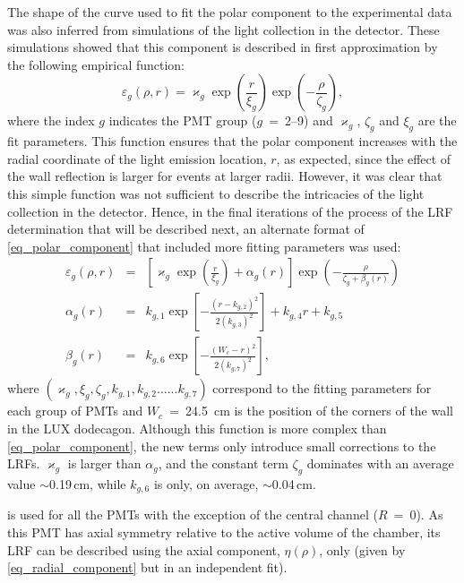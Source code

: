 \documentclass[a4paper,11pt]{article}
\begin{document}
The shape of the curve used to fit the polar component to the experimental data was also inferred from simulations of the light collection in the detector. These simulations showed that this component is described in first approximation by the following empirical function:
\begin{equation}
\varepsilon_g \left(\rho, r\right) = \varkappa_g \exp{\left(\frac{r}{\xi_g}\right)}\exp{\left(-\frac{\rho}{\zeta_g}\right)},
\label{eq_polar_component}
\end{equation}
where the index $g$ indicates the PMT group ($g$~=~2--9) and $\varkappa_g$, $\zeta_g$ and $\xi_g$ are the fit parameters. This function ensures that the polar component increases with the radial coordinate of the light emission location, $r$, as expected, since the effect of the wall reflection is larger for  events at larger radii. However, it was clear that this simple function was not sufficient to describe the intricacies of the light collection in the detector. Hence, in the final iterations of the process of the LRF determination that will be described next, an alternate format of \cref{eq_polar_component} that included more fitting parameters was used:
\begin{eqnarray}
\varepsilon_g \left(\rho, r\right)  & = & \left[\varkappa_g \exp{\left(\frac{r}{\xi_g}\right)} + \alpha_g(r) \right]\exp{\left(-\frac{\rho}{\zeta_g + \beta_g(r)}\right)}\nonumber\\
\alpha_g\left(r\right)  & = & k_{g,1} \exp{\left[-\frac{\left(r-k_{g,2}\right)^2}{2\left(k_{g,3}\right)^2}\right]} + k_{g,4} r + k_{g,5} \nonumber \\
\beta_g\left(r\right)  & = & k_{g,6}\exp{\left[ -\frac{\left(W_c-r\right)^2}{2\left(k_{g,7}\right)^2}\right]},
\label{eq_polst}
\end{eqnarray}
where $\left(\varkappa_g, \xi_g, \zeta_g, k_{g,1}, k_{g,2} ...... k_{g, 7}\right)$ correspond to the fitting parameters for each group of PMTs and $W_c$~=~24.5~cm is the position of the corners of the wall in the LUX dodecagon. Although this function is more complex than \cref{eq_polar_component}, the new terms only introduce small corrections to the LRFs. $\varkappa_g$ is larger than $\alpha_g$, and the constant term $\zeta_g$ dominates with an average value  $\sim$0.19\,cm, while $k_{g,6}$ is only, on average, $\sim$0.04\,cm.

 is used for all the PMTs with the exception of the central channel ($R$~=~0). As this PMT has axial symmetry relative to the active volume of the chamber, its LRF can be described using the axial component, $\eta(\rho)$, only (given by \cref{eq_radial_component} but in an independent fit).
\end{document}
